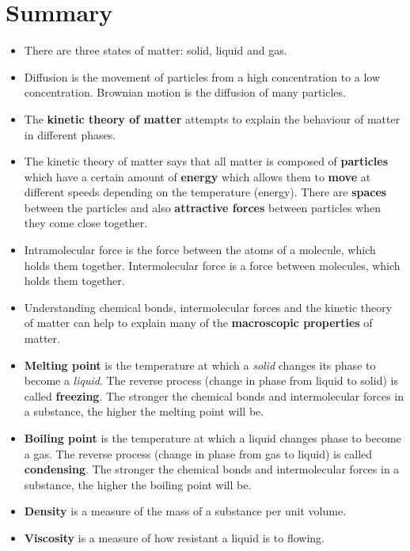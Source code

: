 \label{m38730*cid7}
            \section{Summary}
            \nopagebreak
\label{m38730*id311034}\begin{itemize}[noitemsep]
            \label{m38730*id973}\item There are three states of matter: solid, liquid and gas.\label{m38730*id872}\item Diffusion is the movement of particles from a high concentration to a low concentration. Brownian motion is the diffusion of many particles.\label{m38730*uid80}\item The \textbf{kinetic theory of 
matter} attempts to explain the behaviour of matter in different 
phases.
\label{m38730*uid81}\item The kinetic theory of matter says that all matter is 
composed of \textbf{particles} which have a certain 
amount of \textbf{energy} which allows them to 
\textbf{move} at different speeds depending on the 
temperature (energy). There are \textbf{spaces} 
between the particles and also \textbf{attractive 
forces} between particles when they come close together.
\label{m38730*id643}\item Intramolecular force is the force between the atoms of a molecule, which holds 
them together. Intermolecular force is a force between molecules, which holds them together. \label{m38730*uid82}\item Understanding chemical bonds, intermolecular forces and 
the kinetic theory of matter can help to explain many of the \textbf{macroscopic properties} of matter.
\label{m38730*uid83}\item \textbf{Melting point} is the 
temperature at which a \textsl{solid} changes its 
phase to become a \textsl{liquid}. The reverse 
process (change in phase from liquid to solid) is called \textbf{freezing}. The stronger the chemical bonds and 
intermolecular forces in a substance, the higher the melting point will be.
\label{m38730*uid84}\item \textbf{Boiling point} is the 
temperature at which a liquid changes phase to become a gas. The reverse 
process (change in phase from gas to liquid) is called \textbf{condensing}. The stronger the 
chemical bonds and intermolecular forces in a substance, the higher the boiling 
point will be.
\label{m38730*uid85}\item \textbf{Density} is a measure 
of the mass of a substance per unit volume.
\label{m38730*uid86}\item \textbf{Viscosity} is a 
measure of how resistant a liquid is to flowing.
\end{itemize}

